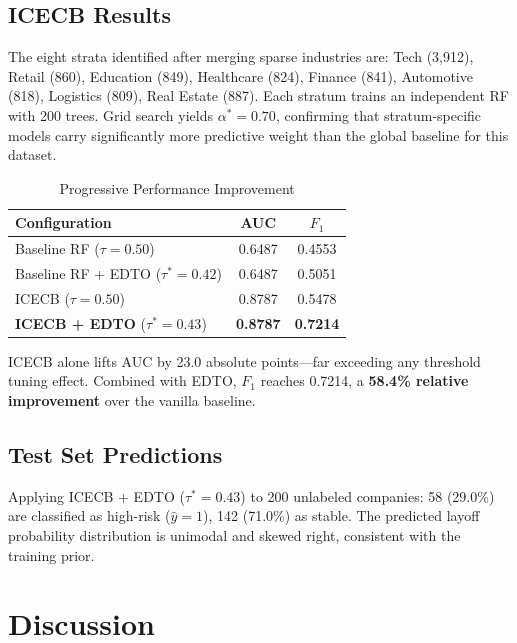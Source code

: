 \documentclass[conference]{IEEEtran}
\begin{document}
\subsection{ICECB Results}

The eight strata identified after merging sparse industries are: Tech (3,912), Retail (860), Education (849), Healthcare (824), Finance (841), Automotive (818), Logistics (809), Real Estate (887). Each stratum trains an independent RF with 200 trees. Grid search yields $\alpha^* = 0.70$, confirming that stratum-specific models carry significantly more predictive weight than the global baseline for this dataset.

\begin{table}[htbp]
\caption{Progressive Performance Improvement}
\label{tab:progressive}
\begin{center}
\begin{tabular}{lcc}
\toprule
\textbf{Configuration} & \textbf{AUC} & \boldmath$F_1$ \\
\midrule
Baseline RF ($\tau = 0.50$)          & 0.6487 & 0.4553 \\
Baseline RF + EDTO ($\tau^* = 0.42$) & 0.6487 & 0.5051 \\
ICECB ($\tau = 0.50$)                & 0.8787 & 0.5478 \\
\textbf{ICECB + EDTO} ($\tau^* = 0.43$) & \textbf{0.8787} & \textbf{0.7214} \\
\bottomrule
\end{tabular}
\end{center}
\end{table}

ICECB alone lifts AUC by 23.0 absolute points---far exceeding any threshold tuning effect. Combined with EDTO, $F_1$ reaches 0.7214, a \textbf{58.4\% relative improvement} over the vanilla baseline.

\subsection{Test Set Predictions}

Applying ICECB + EDTO ($\tau^* = 0.43$) to 200 unlabeled companies: 58 (29.0\%) are classified as high-risk ($\hat{y} = 1$), 142 (71.0\%) as stable. The predicted layoff probability distribution is unimodal and skewed right, consistent with the training prior.

\section{Discussion}
\label{sec:discussion}
\end{document}
